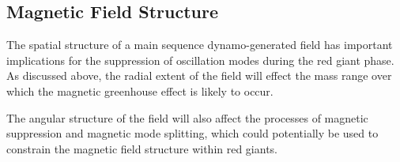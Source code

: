 \subsection{Magnetic Field Structure}
\label{fieldstruc}

The spatial structure of a main sequence dynamo-generated field has important implications for the suppression of oscillation modes during the red giant phase. As discussed above, the radial extent of the field will effect the mass range over which the magnetic greenhouse effect is likely to occur.

The angular structure of the field will also affect the processes of magnetic suppression and magnetic mode splitting, which could potentially be used to constrain the magnetic field structure within red giants. 